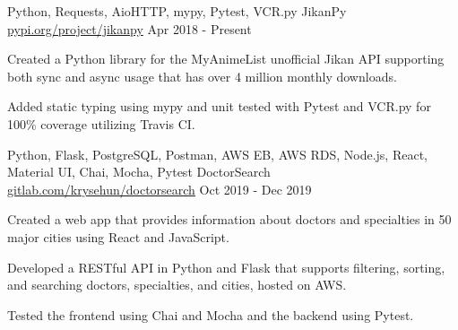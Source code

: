 

\begin{cventries}

  \cventry
  {Python, Requests, AioHTTP, mypy, Pytest, VCR.py} %
  {JikanPy} %
  {\href{https://pypi.org/project/jikanpy/}{pypi.org/project/jikanpy}} %
  {Apr 2018 - Present} %
  {
    \begin{cvitems} %
      \item {Created a Python library for the MyAnimeList unofficial Jikan API supporting both sync and async usage that has over 4 million monthly downloads.}
      \item {Added static typing using mypy and unit tested with Pytest and VCR.py for 100\% coverage utilizing Travis CI.}
    \end{cvitems}
  }

  \cventry
  {Python, Flask, PostgreSQL, Postman, AWS EB, AWS RDS, Node.js, React, Material UI, Chai, Mocha, Pytest} %
  {DoctorSearch} %
  {\href{https://gitlab.com/krysehun/doctorsearch}{gitlab.com/krysehun/doctorsearch}} %
  {Oct 2019 - Dec 2019} %
  {
    \begin{cvitems} %
      \item {Created a web app that provides information about doctors and specialties in 50 major cities using React and JavaScript.}
      \item {Developed a RESTful API in Python and Flask that supports filtering, sorting, and searching doctors, specialties, and cities, hosted on AWS.}
      \item {Tested the frontend using Chai and Mocha and the backend using Pytest.}
    \end{cvitems}
  }

\end{cventries}
